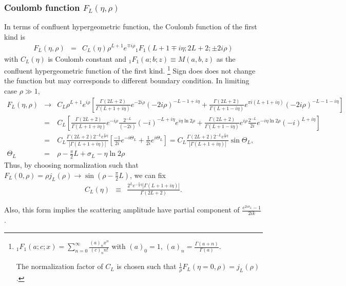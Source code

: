 \documentclass[10pt]{book}
\newcommand{\bea}{\begin{eqnarray}}
\newcommand{\eea}{\end{eqnarray}}
\newcommand{\no}{\nonumber \\}
\begin{document}
\subsubsection{Coulomb function $F_L(\eta,\rho)$}
In terms of confluent hypergeometric function, 
the Coulomb function of the first kind is
\bea
F_L(\eta,\rho)&=&C_L(\eta) \rho^{L+1} e^{\mp i\rho}
         {}_1F_1(L+1\mp i\eta;2L+2; \pm 2i\rho)
\eea
with $C_L(\eta)$ is Coulomb constant and
$_1F_1(a;b;z)\equiv M(a,b,z)$ as the 
confluent hypergeometric function of the first kind.
\footnote{
$_1F_1(a;c;x)=\sum_{n=0}^\infty \frac{(a)_n x^n}{(c)_n n!}$
with $(a)_0=1$, $(a)_n=\frac{\Gamma(a+n)}{\Gamma(a)}$.

The normalization factor of $C_L$ is chosen such that 
$\frac{1}{\rho}F_L(\eta=0,\rho)=j_L(\rho)$.
} 
Sign does does not change the function but may corresponds to different boundary condition.
In limiting case $\rho\gg 1$,
\bea 
F_L(\eta,\rho) &\to& C_L \rho^{L+1}e^{i\rho}\left[ 
    \frac{\Gamma(2L+2)}{\Gamma(L+1+i\eta)}e^{-2i\rho}(-2i\rho)^{-L-1+i\eta}
   +\frac{\Gamma(2L+2)}{\Gamma(L+1-i\eta)} e^{\pi i (L+1+i\eta)}(-2i\rho)^{-L-1-i\eta}     
\right] \no 
&=& C_L   \left[ \frac{\Gamma(2L+2)}{\Gamma(L+1+i\eta)} e^{-i\rho}
                 \frac{2^{-L}}{(-2i)}(-i)^{-L+i\eta}e^{i\eta\ln 2\rho} 
           +\frac{\Gamma(2L+2)}{\Gamma(L+1-i\eta)} 
           e^{i\rho}\frac{2^{-L}}{2i}e^{-i\eta\ln 2\rho}(-i)^{L+i\eta}\right] \no 
&=& C_L \frac{\Gamma(2L+2)2^{-L}e^{\frac{\pi}{2}\eta}}{|\Gamma(L+1+i\eta)|} 
   \left[ \frac{-1}{2i}e^{-i\Theta_L}
         +\frac{1}{2i}e^{i\Theta_L}
   \right] =C_L \frac{\Gamma(2L+2)2^{-L}e^{\frac{\pi}{2}\eta}}{|\Gamma(L+1+i\eta)|}
           \sin\Theta_L ,\no 
\Theta_L &=&\rho-\frac{\pi}{2}L + \sigma_L-\eta\ln 2\rho            
\eea 
Thus, by choosing normalization such that $F_L(0,\rho)=\rho j_L(\rho)\to \sin(\rho-\frac{\pi}{2}L)$, 
we can fix
\bea 
C_L(\eta)&\equiv& \frac{2^L e^{-\frac{\pi}{2}\eta}|\Gamma(L+1+i\eta)|}
                       {\Gamma(2L+2)}.
\eea 

Also, this form implies the scattering amplitude have 
partial component of $\frac{e^{2i\sigma_L}-1}{2ik}$.
\end{document}
